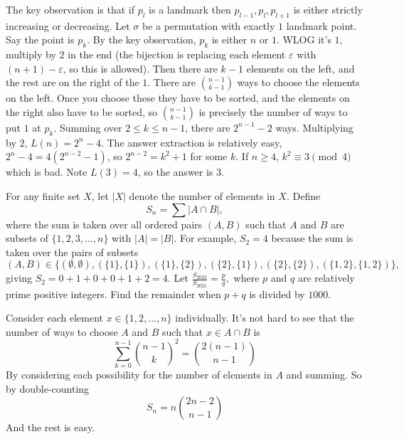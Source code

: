 \documentclass[11pt]{scrartcl}
\begin{document}
\begin{soln}
  The key observation is that if $p_l$ is a landmark then $p_{l-1}, p_l, p_{l+1}$ is either strictly increasing or decreasing. Let $\sigma$ be a permutation with exactly $1$ landmark point. Say the point is $p_k$. By the key observation, $p_k$ is either $n$ or $1$. WLOG it's $1$, multiply by $2$ in the end (the bijection is replacing each element $\varepsilon$ with $(n+1)-\varepsilon$, so this is allowed). Then there are $k-1$ elements on the left, and the rest are on the right of the $1$. There are $\binom{n-1}{k-1}$ ways to choose the elements on the left. Once you choose these they have to be sorted, and the elements on the right also have to be sorted, so $\binom{n-1}{k-1}$ is precisely the number of ways to put $1$ at $p_k$. Summing over $2\le k\le n-1$, there are $2^{n-1}-2$ ways. Multiplying by $2$, $L(n)=2^n-4$. The answer extraction is relatively easy, $2^n-4=4(2^{n-2}-1)$, so $2^{n-2}=k^2+1$ for some $k$. If $n\ge 4$, $k^2\equiv 3\pmod{4}$ which is bad. Note $L(3)=4$, so the answer is $3$.
\end{soln}
\begin{example}
  [2022 AIME I \#12]
  For any finite set $X$, let $|X|$ denote the number of elements in $X.$ Define$$S_n = \sum |A \cap B|,$$where the sum is taken over all ordered pairs $(A, B)$ such that $A$ and $B$ are subsets of $\{1, 2, 3, …, n\}$ with $|A| = |B|.$ For example, $S_2 = 4$ because the sum is taken over the pairs of subsets$$(A, B) \in \{ (\emptyset, \emptyset), (\{1\}, \{1\}), (\{1\}, \{2\}), (\{2\}, \{1\}), (\{2\}, \{2\}), (\{1, 2\}, \{1, 2\})\},$$giving $S_2 = 0 + 1 + 0 + 0 + 1 + 2 = 4.$ Let $\frac{S_{2022}}{S_{2021}} = \frac{p}{q},$ where $p$ and $q$ are relatively prime positive integers. Find the remainder when $p + q$ is divided by $1000.$
\end{example}
\begin{soln}
  Consider each element $x\in\{1,2,...,n\}$ individually. It's not hard to see that the number of ways to choose $A$ and $B$ such that $x\in A\cap B$ is
$$\sum_{k=0}^{n-1}\binom{n-1}{k}^2=\binom{2(n-1)}{n-1}$$By considering each possibility for the number of elements in $A$ and summing. So by double-counting
$$S_n=n\binom{2n-2}{n-1}$$And the rest is easy.
\end{soln}
\newpage
\end{document}
